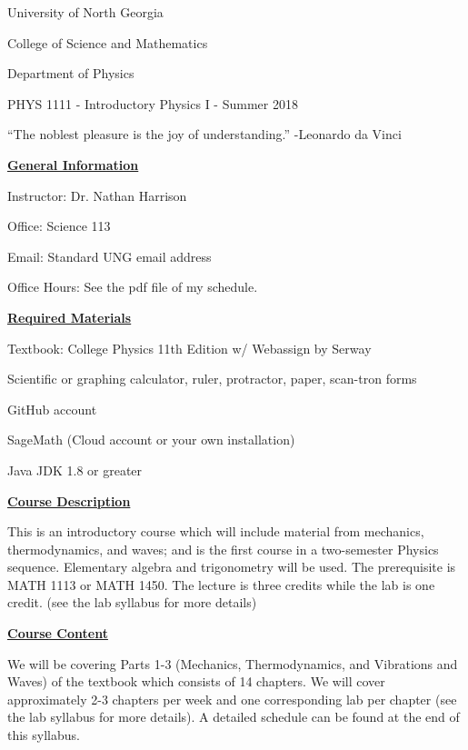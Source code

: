 \documentclass[12pt]{article}
\begin{document}
{\centering
\large University of North Georgia \par
\large College of Science and Mathematics \par
\large Department of Physics \par
\large PHYS 1111 - Introductory Physics I - Summer 2018 \par
}
\hfill \break \vspace{-4mm}

``The noblest pleasure is the joy of understanding.'' -Leonardo da Vinci
\hfill \break

\underline{\textbf{General Information}} \par
Instructor: Dr. Nathan Harrison \par
Office: Science 113 \par
Email: Standard UNG email address \par
Office Hours: See the pdf file of my schedule.
\hfill \break

\underline{\textbf{Required Materials}} \par
Textbook: College Physics 11th Edition w/ Webassign by Serway \par
Scientific or graphing calculator, ruler, protractor, paper, scan-tron forms \par
GitHub account \par
SageMath (Cloud account or your own installation) \par
Java JDK 1.8 or greater
\hfill \break

\underline{\textbf{Course Description}} \par
This is an introductory course which will include material from mechanics, thermodynamics, and waves;
and is the first course in a two-semester Physics sequence.
Elementary algebra and trigonometry will be used.
The prerequisite is MATH 1113 or MATH 1450.
The lecture is three credits while the lab is one credit. (see the lab syllabus for more details)
\hfill \break

\underline{\textbf{Course Content}} \par
We will be covering Parts 1-3 (Mechanics, Thermodynamics, and Vibrations and Waves) of the textbook which consists of 14 chapters.
We will cover approximately 2-3 chapters per week and one corresponding lab per chapter (see the lab syllabus for more details). A detailed schedule can be found at the end of this syllabus.
\hfill \break
\end{document}
